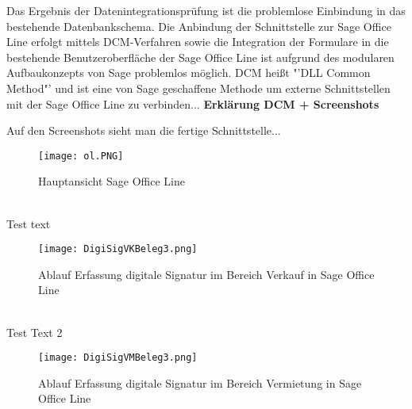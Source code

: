 Das Ergebnis der Datenintegrationsprüfung ist die problemlose Einbindung in das bestehende Datenbankschema. Die Anbindung der Schnittstelle zur Sage Office Line erfolgt mittels DCM-Verfahren sowie die Integration der Formulare in die bestehende Benutzeroberfläche der Sage Office Line ist aufgrund des modularen Aufbaukonzepts von Sage problemlos möglich. DCM heißt "'DLL Common Method"' und ist eine von Sage geschaffene Methode um externe Schnittstellen mit der Sage Office Line zu verbinden... \textbf{Erklärung DCM + Screenshots}

Auf den Screenshots sieht man die fertige Schnittstelle...
\begin{figure}[!ht]
    \centering
    \texttt{[image: ol.PNG]}
    \caption[Hauptansicht Sage Office Line]{Hauptansicht Sage Office Line}
    \label{fig:5}
\end{figure}\\
Test text
\begin{figure}[!ht]
    \centering
    \texttt{[image: DigiSigVKBeleg3.png]}
    \caption[Ablauf Erfassung digitale Signatur in Sage Office Line (Verkauf)]{Ablauf Erfassung digitale Signatur im Bereich Verkauf in Sage Office Line}
    \label{fig:6}
\end{figure}\\
Test Text 2
\begin{figure}[!ht]
    \centering
    \texttt{[image: DigiSigVMBeleg3.png]}
    \caption[Ablauf Erfassung digitale Signatur in Sage Office Line (Vermietung)]{Ablauf Erfassung digitale Signatur im Bereich Vermietung in Sage Office Line}
    \label{fig:7}
\end{figure}